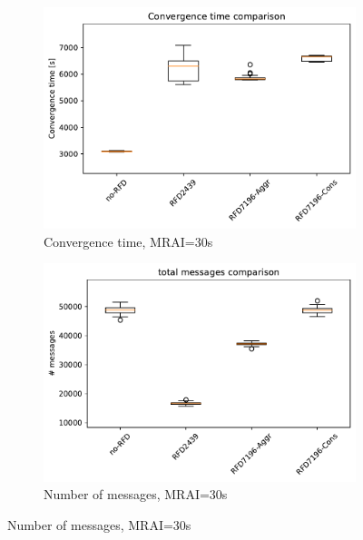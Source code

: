 \begin{figure}[H]
     \vfill
     \begin{subfigure}[b]{0.325\textwidth}
         \centering
         \includegraphics[width=\textwidth]{images/RFD/miceVSelephants/MultiMRAI/30/mice/cisco_1000MRAI30_rfd_comparison_time_boxplot.pdf}
         \caption{\scriptsize Convergence time, MRAI=30s}
         \label{fig:1000_RFD_MRAI30_time_mice}
     \end{subfigure}
     \hfill
     \begin{subfigure}[b]{0.325\textwidth}
         \centering
         \includegraphics[width=\textwidth]{images/RFD/miceVSelephants/MultiMRAI/30/mice/cisco_1000MRAI30_rfd_comparison_messages_boxplot.pdf}
         \caption{\scriptsize Number of messages, MRAI=30s}
         \label{fig:1000_RFD_MRAI30_messages_mice}
     \end{subfigure}

\end{figure}
